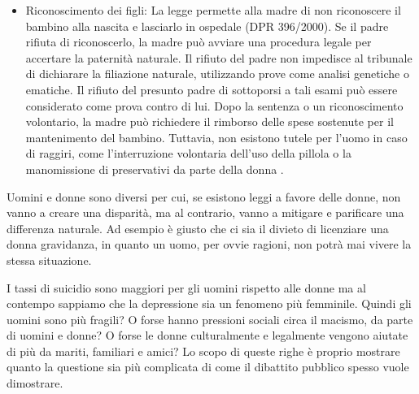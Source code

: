\documentclass[12pt]{book} %
\begin{document}
\begin{itemize}
\begin{itemize}
    \item Riconoscimento dei figli: La legge permette alla madre di non riconoscere il bambino alla nascita e lasciarlo in ospedale (DPR 396/2000). Se il padre rifiuta di riconoscerlo, la madre può avviare una procedura legale per accertare la paternità naturale. Il rifiuto del padre non impedisce al tribunale di dichiarare la filiazione naturale, utilizzando prove come analisi genetiche o ematiche. Il rifiuto del presunto padre di sottoporsi a tali esami può essere considerato come prova contro di lui. Dopo la sentenza o un riconoscimento volontario, la madre può richiedere il rimborso delle spese sostenute per il mantenimento del bambino. Tuttavia, non esistono tutele per l’uomo in caso di raggiri, come l’interruzione volontaria dell’uso della pillola o la manomissione di preservativi da parte della donna  .
    \end{itemize}
\end{itemize}

Uomini e donne sono diversi per cui, se esistono leggi a favore delle donne, non vanno a creare una disparità, ma al contrario, vanno a mitigare e parificare una differenza naturale. Ad esempio è giusto che ci sia il divieto di licenziare una donna gravidanza, in quanto un uomo, per ovvie ragioni, non potrà mai vivere la stessa situazione. 

I tassi di suicidio sono
maggiori per gli uomini rispetto alle donne ma al contempo sappiamo che la depressione sia un fenomeno più femminile.
Quindi gli uomini sono più fragili? O forse hanno pressioni sociali circa il macismo, da parte di uomini e donne? O
forse le donne culturalmente e legalmente vengono aiutate di più da mariti, familiari e amici? Lo scopo di
queste righe è proprio mostrare quanto la questione sia più complicata di come il dibattito pubblico spesso vuole dimostrare.
\end{document}
